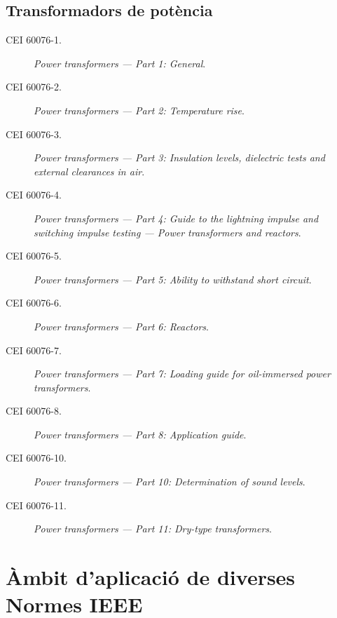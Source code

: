 \subsection*{Transformadors de potència}
\begin{description}
    \item [\hspace{5mm}CEI 60076-1.] \textit{Power transformers --- Part 1: General}.
    \item [\hspace{5mm}CEI 60076-2.] \textit{Power transformers --- Part 2: Temperature rise}.
    \item [\hspace{5mm}CEI 60076-3.] \textit{Power transformers --- Part 3: Insulation levels, dielectric tests and external clearances in air}.
    \item [\hspace{5mm}CEI 60076-4.] \textit{Power transformers --- Part 4: Guide to the lightning impulse and switching impulse testing --- Power transformers and reactors}.
    \item [\hspace{5mm}CEI 60076-5.] \textit{Power transformers --- Part 5: Ability to withstand short circuit}.
    \item [\hspace{5mm}CEI 60076-6.] \textit{Power transformers --- Part 6: Reactors}.
    \item [\hspace{5mm}CEI 60076-7.] \textit{Power transformers --- Part 7: Loading guide for oil-immersed power transformers}.
    \item [\hspace{5mm}CEI 60076-8.] \textit{Power transformers --- Part 8: Application guide}.
    \item [\hspace{5mm}CEI 60076-10.] \textit{Power transformers --- Part 10: Determination of sound levels}.
    \item [\hspace{5mm}CEI 60076-11.] \textit{Power transformers --- Part 11: Dry-type transformers}.
\end{description}


\section{Àmbit d'aplicació de diverses Normes IEEE}\label{sec:normes_IEEE}

